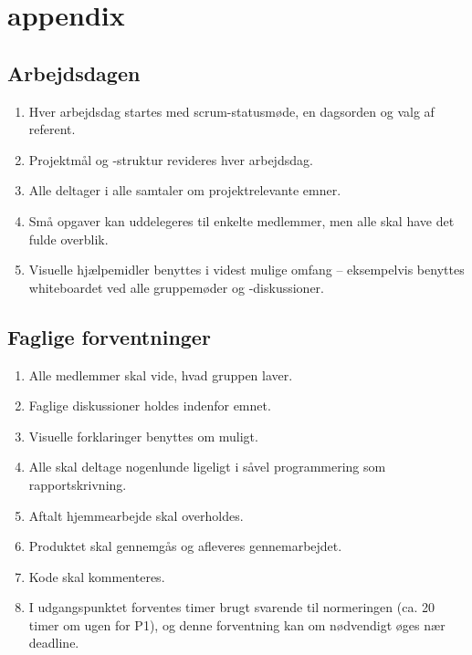\section{appendix}\label{app:contract}

\renewcommand*{\theenumi}{§\arabic{enumi}}

\subsection*{Arbejdsdagen}

\begin{enumerate}
  \item Hver arbejdsdag startes med scrum-statusmøde, en dagsorden og valg af referent.
  \item Projektmål og -struktur revideres hver arbejdsdag.
  \item Alle deltager i alle samtaler om projektrelevante emner.
  \item Små opgaver kan uddelegeres til enkelte medlemmer, men alle skal have det fulde overblik.
  \item Visuelle hjælpemidler benyttes i videst mulige omfang -- eksempelvis benyttes whiteboardet ved alle gruppemøder og -diskussioner.
\end{enumerate}

\subsection*{Faglige forventninger}

\begin{enumerate}
  \item Alle medlemmer skal vide, hvad gruppen laver.
  \item Faglige diskussioner holdes indenfor emnet.
  \item Visuelle forklaringer benyttes om muligt.
  \item Alle skal deltage nogenlunde ligeligt i såvel programmering som rapportskrivning.
  \item Aftalt hjemmearbejde skal overholdes.
  \item Produktet skal gennemgås og afleveres gennemarbejdet.
  \item Kode skal kommenteres.
  \item I udgangspunktet forventes timer brugt svarende til normeringen (ca. 20 timer om ugen for P1), og denne forventning kan om nødvendigt øges nær deadline.
\end{enumerate}

